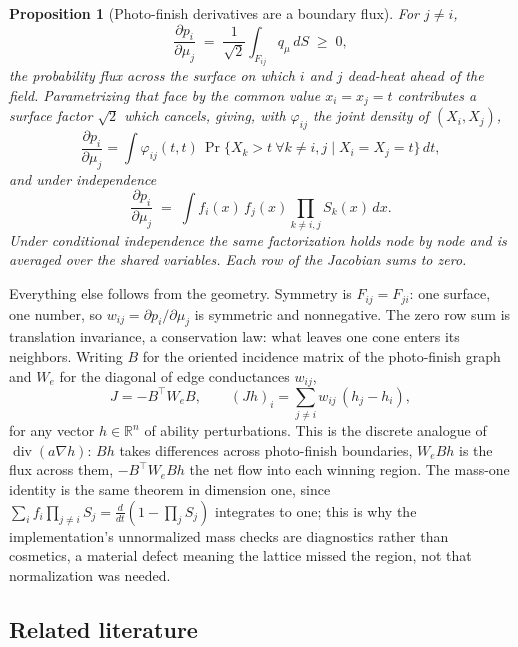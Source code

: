 \documentclass[11pt]{article}
\newtheorem{proposition}{Proposition}
\newcommand{\R}{\mathbb{R}}
\begin{document}
\begin{proposition}[Photo-finish derivatives are a boundary flux]
\label{prop:tie}
For $j\ne i$,
\begin{equation}\label{eq:flux}
\frac{\partial p_i}{\partial\mu_j}
 \;=\;\frac{1}{\sqrt2}\int_{F_{ij}}q_\mu\,dS\;\ge\;0 ,
\end{equation}
the probability flux across the surface on which $i$ and $j$ dead-heat
ahead of the field. Parametrizing that face by the common value
$x_i=x_j=t$ contributes a surface factor $\sqrt2$ which cancels, giving,
with $\varphi_{ij}$ the joint density of $(X_i,X_j)$,
\begin{equation}\label{eq:tiecorr}
\frac{\partial p_i}{\partial\mu_j}
 =\int \varphi_{ij}(t,t)\,
   \Pr\{X_k>t\ \forall k\ne i,j \mid X_i=X_j=t\}\,dt ,
\end{equation}
and under independence
\begin{equation}\label{eq:tie}
\frac{\partial p_i}{\partial \mu_j}
  \;=\; \int f_i(x)\,f_j(x)\prod_{k\ne i,j}S_k(x)\,dx .
\end{equation}
Under conditional independence the same factorization holds node by node
and is averaged over the shared variables. Each row of the Jacobian sums
to zero.
\end{proposition}

Everything else follows from the geometry. Symmetry is $F_{ij}=F_{ji}$:
one surface, one number, so $w_{ij}=\partial p_i/\partial\mu_j$ is
symmetric and nonnegative. The zero row sum is translation invariance, a
conservation law: what leaves one cone enters its neighbors. Writing $B$
for the oriented incidence matrix of the photo-finish graph and $W_e$ for
the diagonal of edge conductances $w_{ij}$,
\[
   J=-B^{\top}W_eB,
   \qquad
   (Jh)_i=\sum_{j\ne i}w_{ij}\,(h_j-h_i),
\]
for any vector $h\in\R^n$ of ability perturbations. This is the discrete analogue of $\operatorname{div}(a\nabla h)$: $Bh$ takes
differences across photo-finish boundaries, $W_eBh$ is the flux across
them, $-B^{\top}W_eBh$ the net flow into each winning region. The
mass-one identity is the same theorem in dimension one, since
$\sum_i f_i\prod_{j\ne i}S_j = \tfrac{d}{dt}(1-\prod_j S_j)$
integrates to one; this is why the implementation's unnormalized mass
checks are diagnostics rather than cosmetics, a material defect meaning
the lattice missed the region, not that normalization was needed.

\subsection{Related literature}
\end{document}
